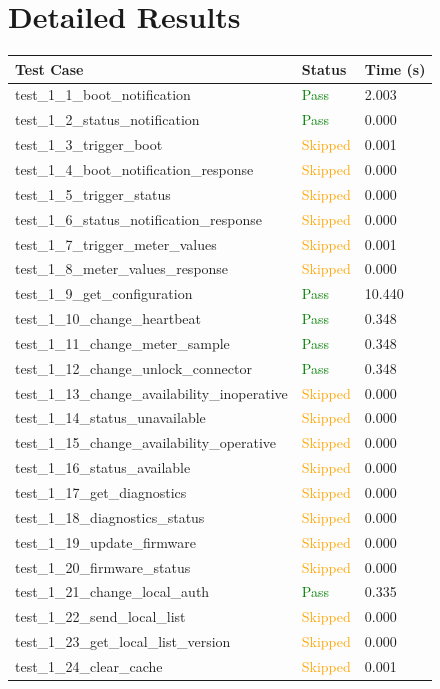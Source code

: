 \documentclass{article}
\begin{document}
\section{Detailed Results}
\begin{longtable}{p{} p{} p{}}
\toprule
\textbf{Test Case} & \textbf{Status} & \textbf{Time (s)} \\
\midrule
\endhead
test\_1\_1\_boot\_notification & \textcolor{green}{Pass} & 2.003 \\
test\_1\_2\_status\_notification & \textcolor{green}{Pass} & 0.000 \\
test\_1\_3\_trigger\_boot & \textcolor{orange}{Skipped} & 0.001 \\
test\_1\_4\_boot\_notification\_response & \textcolor{orange}{Skipped} & 0.000 \\
test\_1\_5\_trigger\_status & \textcolor{orange}{Skipped} & 0.000 \\
test\_1\_6\_status\_notification\_response & \textcolor{orange}{Skipped} & 0.000 \\
test\_1\_7\_trigger\_meter\_values & \textcolor{orange}{Skipped} & 0.001 \\
test\_1\_8\_meter\_values\_response & \textcolor{orange}{Skipped} & 0.000 \\
test\_1\_9\_get\_configuration & \textcolor{green}{Pass} & 10.440 \\
test\_1\_10\_change\_heartbeat & \textcolor{green}{Pass} & 0.348 \\
test\_1\_11\_change\_meter\_sample & \textcolor{green}{Pass} & 0.348 \\
test\_1\_12\_change\_unlock\_connector & \textcolor{green}{Pass} & 0.348 \\
test\_1\_13\_change\_availability\_inoperative & \textcolor{orange}{Skipped} & 0.000 \\
test\_1\_14\_status\_unavailable & \textcolor{orange}{Skipped} & 0.000 \\
test\_1\_15\_change\_availability\_operative & \textcolor{orange}{Skipped} & 0.000 \\
test\_1\_16\_status\_available & \textcolor{orange}{Skipped} & 0.000 \\
test\_1\_17\_get\_diagnostics & \textcolor{orange}{Skipped} & 0.000 \\
test\_1\_18\_diagnostics\_status & \textcolor{orange}{Skipped} & 0.000 \\
test\_1\_19\_update\_firmware & \textcolor{orange}{Skipped} & 0.000 \\
test\_1\_20\_firmware\_status & \textcolor{orange}{Skipped} & 0.000 \\
test\_1\_21\_change\_local\_auth & \textcolor{green}{Pass} & 0.335 \\
test\_1\_22\_send\_local\_list & \textcolor{orange}{Skipped} & 0.000 \\
test\_1\_23\_get\_local\_list\_version & \textcolor{orange}{Skipped} & 0.000 \\
test\_1\_24\_clear\_cache & \textcolor{orange}{Skipped} & 0.001 \\
\bottomrule
\end{longtable}
\end{document}

